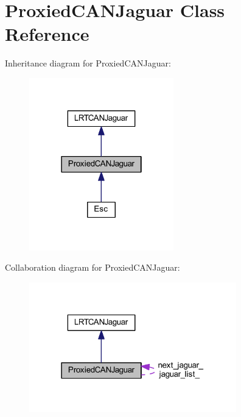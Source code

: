 \hypertarget{class_proxied_c_a_n_jaguar}{
\section{\-Proxied\-C\-A\-N\-Jaguar \-Class \-Reference}
\label{class_proxied_c_a_n_jaguar}
}


\-Inheritance diagram for \-Proxied\-C\-A\-N\-Jaguar\-:\nopagebreak
\begin{figure}[H]
\begin{center}
\leavevmode
\includegraphics[width=178pt]{class_proxied_c_a_n_jaguar__inherit__graph}
\end{center}
\end{figure}


\-Collaboration diagram for \-Proxied\-C\-A\-N\-Jaguar\-:\nopagebreak
\begin{figure}[H]
\begin{center}
\leavevmode
\includegraphics[width=255pt]{class_proxied_c_a_n_jaguar__coll__graph}
\end{center}
\end{figure}
